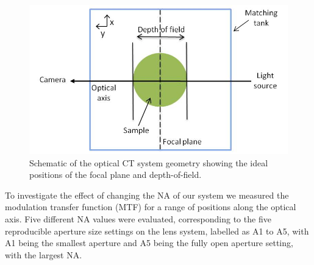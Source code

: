 


\begin{figure}[H]
	\centering
	\includegraphics[width=0.9\linewidth]{meth_img/ideal_dof_diagram}
	\caption{Schematic of the optical CT system geometry showing the ideal positions of the focal plane and depth-of-field.}
	\label{fig:idealdof}
\end{figure}



To investigate the effect of changing the NA of our system we measured the modulation transfer function (MTF) for a range of positions along the optical axis. Five different NA values were evaluated, corresponding to the five reproducible aperture size settings on the lens system, labelled as A1 to A5, with A1 being the smallest aperture and A5 being the fully open aperture setting, with the largest NA. 

